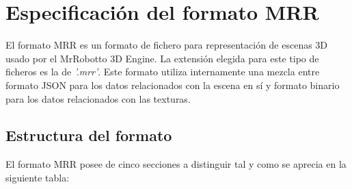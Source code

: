 
\chapter{Especificación del formato MRR} %

\label{AppendixA} %


El formato MRR es un formato de fichero para representación de escenas 3D usado por el MrRobotto 3D Engine.
La extensión elegida para este tipo de ficheros es la de \textit{'.mrr'}.
Este formato utiliza internamente una mezcla entre formato JSON para los datos relacionados con la escena en sí y formato binario para los datos relacionados con las texturas.


\section{Estructura del formato}
El formato MRR posee de cinco secciones a distinguir tal y como se aprecia en la siguiente tabla:

\clearpage

